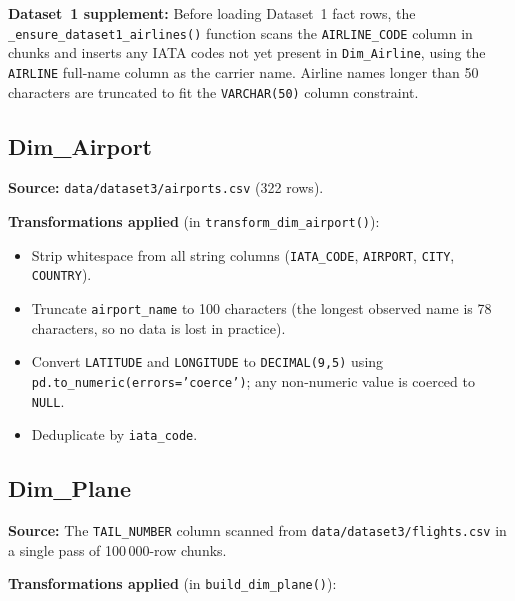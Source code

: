 \documentclass[12pt,a4paper]{article}
\begin{document}
\textbf{Dataset~1 supplement:} Before loading Dataset~1 fact rows, the
\texttt{\_ensure\_dataset1\_airlines()} function scans the
\texttt{AIRLINE\_CODE} column in chunks and inserts any IATA codes not yet
present in \texttt{Dim\_Airline}, using the \texttt{AIRLINE} full-name column
as the carrier name. Airline names longer than 50 characters are truncated to
fit the \texttt{VARCHAR(50)} column constraint.

\subsection{Dim\_Airport}

\textbf{Source:} \texttt{data/dataset3/airports.csv} (322 rows).

\textbf{Transformations applied} (in \texttt{transform\_dim\_airport()}):

\begin{itemize}
    \item Strip whitespace from all string columns
          (\texttt{IATA\_CODE}, \texttt{AIRPORT}, \texttt{CITY},
          \texttt{COUNTRY}).
    \item Truncate \texttt{airport\_name} to 100 characters (the longest
          observed name is 78 characters, so no data is lost in practice).
    \item Convert \texttt{LATITUDE} and \texttt{LONGITUDE} to
          \texttt{DECIMAL(9,5)} using \texttt{pd.to\_numeric(errors='coerce')};
          any non-numeric value is coerced to \texttt{NULL}.
    \item Deduplicate by \texttt{iata\_code}.
\end{itemize}

\subsection{Dim\_Plane}

\textbf{Source:} The \texttt{TAIL\_NUMBER} column scanned from
\texttt{data/dataset3/flights.csv} in a single pass of 100\,000-row chunks.

\textbf{Transformations applied} (in \texttt{build\_dim\_plane()}):
\end{document}
